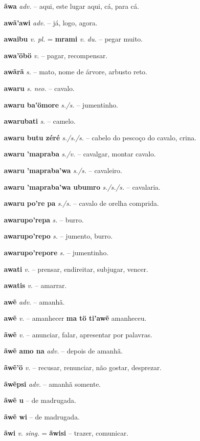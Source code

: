 \textbf{ãwa} \textit{adv.} -- aqui, este lugar aqui, cá, para cá.

\textbf{awã'awi} \textit{adv.} -- já, logo, agora.

\textbf{awaibu} \textit{v. pl.} = \textbf{mrami} \textit{v. du.} -- pegar muito.

\textbf{awa'öbö} \textit{v.} -- pagar, recompensar.

\textbf{awãrã} \textit{s.} -- mato, nome de árvore, arbusto reto.

\textbf{awaru} \textit{s. neo.} -- cavalo.

\textbf{awaru ba'ömore} \textit{s./s.} -- jumentinho.

\textbf{awarubati} \textit{s.} -- camelo.

\textbf{awaru butu zéré} \textit{s./s./s.} -- cabelo do pescoço do cavalo, crina.

\textbf{awaru 'mapraba} \textit{s./v.} -- cavalgar, montar cavalo.

\textbf{awaru 'mapraba'wa} \textit{s./s.} -- cavaleiro.

\textbf{awaru 'mapraba'wa ubumro} \textit{s./s./s.} -- cavalaria.

\textbf{awaru po're pa} \textit{s./s.} -- cavalo de orelha comprida.

\textbf{awarupo'repa} \textit{s.} -- burro.

\textbf{awarupo'repo} \textit{s.} -- jumento, burro.

\textbf{awarupo'repore} \textit{s.} -- jumentinho.

\textbf{awati} \textit{v.} -- prensar, endireitar, subjugar, vencer.

\textbf{awatis} \textit{v.} -- amarrar.

\textbf{awẽ} \textit{adv.} -- amanhã.

\textbf{awẽ} \textit{v.} -- amanhecer  \textbf{ma tö ti'awẽ} amanheceu.

\textbf{ãwẽ} \textit{v.} -- anunciar, falar, apresentar por palavras.

\textbf{ãwẽ amo na} \textit{adv.} -- depois de amanhã.

\textbf{ãwẽ'ö} \textit{v.} -- recusar, renunciar, não gostar, desprezar.

\textbf{ãwẽpsi} \textit{adv.} -- amanhã somente.

\textbf{ãwẽ u} -- de madrugada.

\textbf{ãwẽ wi} -- de madrugada.

\textbf{ãwi} \textit{v. sing.} = \textbf{ãwisi} -- trazer, comunicar.

